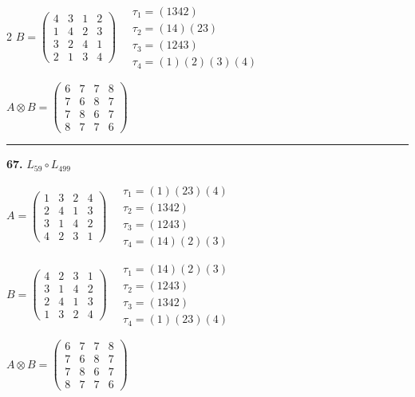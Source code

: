 \begin{multicols}{2}
$B = \begin{pmatrix} 4 & 3 & 1 & 2 \\ 1 & 4 & 2 & 3 \\ 3 & 2 & 4 & 1 \\ 2 & 1 & 3 & 4 \end{pmatrix} \quad \begin{matrix} \tau_{1}=(1 3 4 2) \\ \tau_{2}=(1 4)(2 3) \\ \tau_{3}=(1 2 4 3) \\ \tau_{4}=(1)(2)(3)(4) \end{matrix}$

$A \otimes B = \begin{pmatrix} 6 & 7 & 7 & 8 \\ 7 & 6 & 8 & 7 \\ 7 & 8 & 6 & 7 \\ 8 & 7 & 7 & 6 \end{pmatrix}$

\vspace{0.3em}
\hrule
\vspace{0.3em}

\noindent\textbf{67.} $L_{59} \circ L_{499}$

$A = \begin{pmatrix} 1 & 3 & 2 & 4 \\ 2 & 4 & 1 & 3 \\ 3 & 1 & 4 & 2 \\ 4 & 2 & 3 & 1 \end{pmatrix} \quad \begin{matrix} \tau_{1}=(1)(2 3)(4) \\ \tau_{2}=(1 3 4 2) \\ \tau_{3}=(1 2 4 3) \\ \tau_{4}=(1 4)(2)(3) \end{matrix}$

$B = \begin{pmatrix} 4 & 2 & 3 & 1 \\ 3 & 1 & 4 & 2 \\ 2 & 4 & 1 & 3 \\ 1 & 3 & 2 & 4 \end{pmatrix} \quad \begin{matrix} \tau_{1}=(1 4)(2)(3) \\ \tau_{2}=(1 2 4 3) \\ \tau_{3}=(1 3 4 2) \\ \tau_{4}=(1)(2 3)(4) \end{matrix}$

$A \otimes B = \begin{pmatrix} 6 & 7 & 7 & 8 \\ 7 & 6 & 8 & 7 \\ 7 & 8 & 6 & 7 \\ 8 & 7 & 7 & 6 \end{pmatrix}$


\end{multicols}

